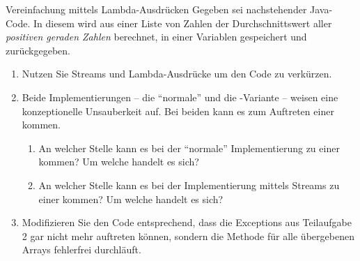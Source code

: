 \documentclass{../tuda-exercise}
\begin{document}
  \begin{task}[credit = \stars{1}{3}]{Vereinfachung mittels Lambda-Ausdrücken}
    Gegeben sei nachstehender Java-Code. In diesem wird aus einer Liste von Zahlen der
    Durchschnittswert aller \textit{positiven geraden Zahlen} berechnet, in einer Variablen
    gespeichert und zurückgegeben.

    

    \begin{enumerate}
      \item Nutzen Sie Streams und Lambda-Ausdrücke um den Code zu verkürzen.
      \item Beide Implementierungen – die \enquote{normale} und die -Variante
      – weisen eine konzeptionelle Unsauberkeit auf. Bei beiden kann es zum Auftreten einer
       kommen.
      \begin{enumerate}
        [label = (\alph*)]
        \item An welcher Stelle kann es bei der \enquote{normale} Implementierung zu einer
         kommen? Um welche handelt es sich?
        \item An welcher Stelle kann es bei der Implementierung mittels Streams zu einer
         kommen? Um welche handelt es sich?
      \end{enumerate}
      \item Modifizieren Sie den Code entsprechend, dass die Exceptions aus Teilaufgabe 2 gar
      nicht mehr auftreten können, sondern die Methode für alle übergebenen Arrays fehlerfrei
      durchläuft.
    \end{enumerate}

    \clearpagesolution


\end{task}
\end{document}
